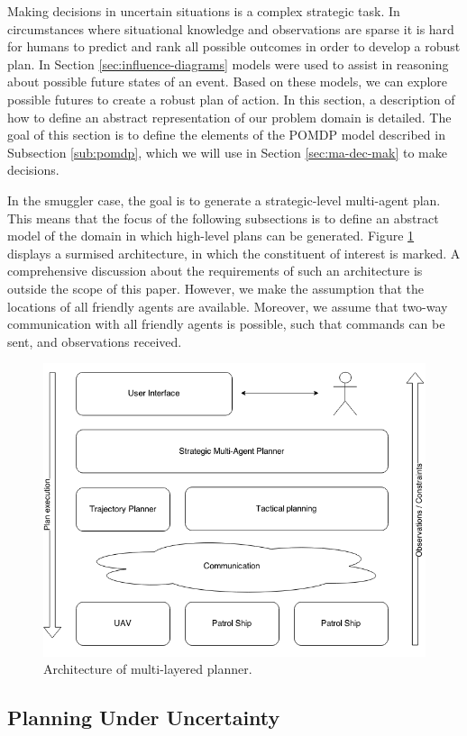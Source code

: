 \documentclass[conference]{IEEEtran}
\begin{document}
Making decisions in uncertain situations is a complex strategic task. In circumstances where situational knowledge and observations are sparse it is hard for humans to predict and rank all possible outcomes in order to develop a robust plan. In Section \ref{sec:influence-diagrams} models were used to assist in reasoning about possible future states of an event. Based on these models, we can explore possible futures to create a robust plan of action. In this section, a description of how to define an abstract representation of our problem domain is detailed. The goal of this section is to define the elements of the POMDP model described in Subsection \ref{sub:pomdp}, which we will use in Section \ref{sec:ma-dec-mak} to make decisions.

In the smuggler case, the goal is to generate a strategic-level multi-agent plan. This means that the focus of the following subsections is to define an abstract model of the domain in which high-level plans can be generated. Figure \ref{fig:planning-archi} displays a surmised architecture, in which the constituent of interest is marked. A comprehensive discussion about the requirements of such an architecture is outside the scope of this paper. However, we make the assumption that the locations of all friendly agents are available. Moreover, we assume that two-way communication with all friendly agents is possible, such that commands can be sent, and observations received.

\begin{figure}[bh]
\begin{center}
 \includegraphics[width=.44\textwidth]{img/planning_archi.png}
 \caption{Architecture of multi-layered planner.}\label{fig:planning-archi}
\end{center}
\end{figure}

\subsection{Planning Under Uncertainty}
\label{sub:plan-uncert}
\end{document}
